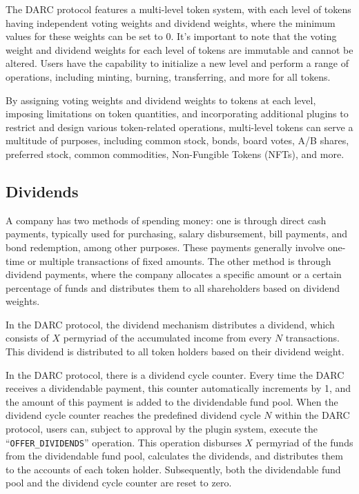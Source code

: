 \documentclass[main.tex]{subfiles}
\begin{document}
The DARC protocol features a multi-level token system, with each level of tokens having independent voting weights and dividend weights, where the minimum values for these weights can be set to 0. It's important to note that the voting weight and dividend weights for each level of tokens are immutable and cannot be altered. Users have the capability to initialize a new level and perform a range of operations, including minting, burning, transferring, and more for all tokens.

By assigning voting weights and dividend weights to tokens at each level, imposing limitations on token quantities, and incorporating additional plugins to restrict and design various token-related operations, multi-level tokens can serve a multitude of purposes, including common stock, bonds, board votes, A/B shares, preferred stock, common commodities, Non-Fungible Tokens (NFTs), and more.

\subsection{Dividends}

A company has two methods of spending money: one is through direct cash payments, typically used for purchasing, salary disbursement, bill payments, and bond redemption, among other purposes. These payments generally involve one-time or multiple transactions of fixed amounts. The other method is through dividend payments, where the company allocates a specific amount or a certain percentage of funds and distributes them to all shareholders based on dividend weights.

In the DARC protocol, the dividend mechanism distributes a dividend, which consists of $X$ permyriad of the accumulated income from every $N$ transactions. This dividend is distributed to all token holders based on their dividend weight. 

In the DARC protocol, there is a dividend cycle counter. Every time the DARC receives a dividendable payment, this counter automatically increments by 1, and the amount of this payment is added to the dividendable fund pool. When the dividend cycle counter reaches the predefined dividend cycle $N$ within the DARC protocol, users can, subject to approval by the plugin system, execute the ``\texttt{OFFER\_DIVIDENDS}'' operation. This operation disburses $X$ permyriad of the funds from the dividendable fund pool, calculates the dividends, and distributes them to the accounts of each token holder. Subsequently, both the dividendable fund pool and the dividend cycle counter are reset to zero.
\end{document}

